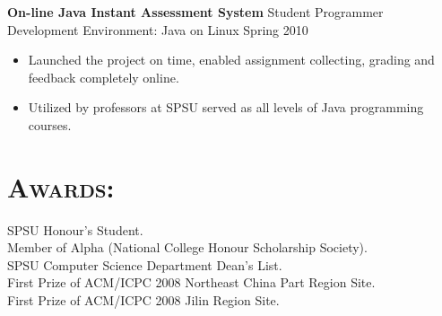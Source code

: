 \begin{resume}
\textbf{On-line Java Instant Assessment System} \hfill Student Programmer\\
Development Environment: Java on Linux \hfill Spring 2010
\begin{itemize}
	\item Launched the project on time, enabled assignment collecting, grading and feedback completely online.
	\item Utilized by professors at SPSU served as all levels of Java programming courses.
\end{itemize}



\section{\textsc{Awards:}} 
SPSU Honour’s Student. \\
Member of Alpha (National College Honour Scholarship Society).  \\
SPSU Computer Science Department Dean's List.\\
First Prize of ACM/ICPC 2008 Northeast China Part Region Site.	\\
First Prize of ACM/ICPC 2008 Jilin Region Site. 





\end{resume}

